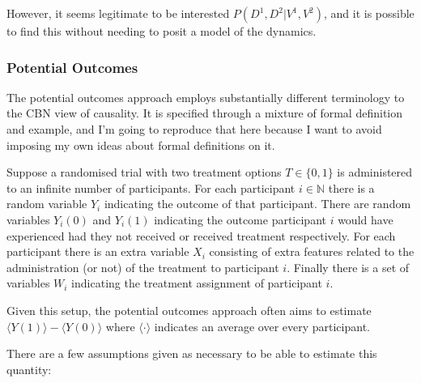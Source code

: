 \begin{center}
\end{center}

However, it seems legitimate to be interested $P(D^1,D^2|V^1,V^2)$, and it is possible to find this without needing to posit a model of the dynamics.

\subsubsection{Potential Outcomes}

The potential outcomes approach employs substantially different terminology to the CBN view of causality. It is specified through a mixture of formal definition and example, and I'm going to reproduce that here because I want to avoid imposing my own ideas about formal definitions on it.

Suppose a randomised trial with two treatment options $T\in\{0,1\}$ is administered to an infinite number of participants. For each participant $i\in\mathbb{N}$ there is a random variable $Y_i$ indicating the outcome of that participant. There are random variables $Y_i(0)$ and $Y_i(1)$ indicating the outcome participant $i$ would have experienced had they not received or received treatment respectively. For each participant there is an extra variable $X_i$ consisting of extra features related to the administration (or not) of the treatment to participant $i$. Finally there is a set of variables $W_i$ indicating the treatment assignment of participant $i$.

Given this setup, the potential outcomes approach often aims to estimate $\langle Y(1) \rangle - \langle Y(0) \rangle$ where $\langle \cdot \rangle$ indicates an average over every participant. 

There are a few assumptions given as necessary to be able to estimate this quantity:

